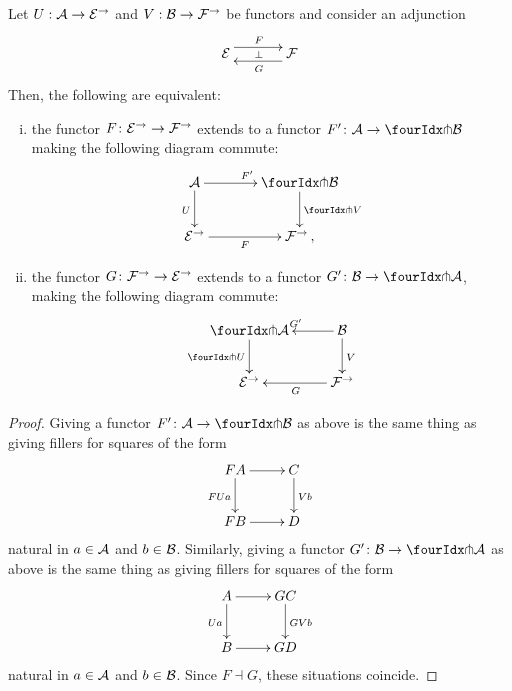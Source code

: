 \documentclass[reqno,10pt,a4paper,oneside]{amsart}
\begin{document}
\begin{proposition} \label{lift-of-adjunction} 
Let $U : \cal{A} \to \cal{E}^{\to}$ and $V : \cal{B} \to \cal{F}^{\to}$ be functors and consider an adjunction
\[
\xymatrix@C+1em{
  \cal{E}
  \ar@<5pt>[r]^{F}
  \ar@{}[r]|{\bot}
&
  \cal{F}
  \ar@<5pt>[l]^{G}
}
\]
Then, the following are equivalent:
\begin{enumerate}[(i)] 
\item the  functor $F \co \cal{E}^\to \to \cal{F}^\to$ extends to a functor $F' \co \cal{A} \to \liftl{\cal{B}}$ making the following diagram commute:
\[
\xymatrix@C=1.2cm{
  \cal{A}
  \ar[r]^{F'}
  \ar[d]_{U}
&
  \liftl{\cal{B}}
  \ar[d]^{\liftl{V}}
\\
  \cal{E}^{\to}
  \ar[r]_-{F}
&
  \cal{F}^{\to}\, ,}
\]
\item the functor $G \co \cal{F}^\to \to \cal{E}^\to$ extends to a functor $G' \co \cal{B} \to \liftr{\cal{A}}$, making the following diagram commute:
\[
\xymatrix{
  \liftr{\cal{A}}
  \ar[d]_{\liftr{U}}
&
  \cal{B}
  \ar[l]_{G'} 
  \ar[d]^{V}
\\
  \cal{E}^{\to}
&
  \cal{F}^{\to}
  \ar[l]^{G}
}
\]
\end{enumerate}
\end{proposition}

\begin{proof} Giving a functor $F' \co \cal{A} \to \liftl{\cal{B}}$ as above is the same thing as giving fillers for squares of the form
\[
\xymatrix{
FA \ar[d]_{FUa} \ar[r] & C \ar[d]^{Vb} \\
FB \ar[r] & D }
\]
natural in $a  \in \cal{A}$ and $b \in \cal{B}$. Similarly, giving a functor $G' \co \cal{B} \to \liftl{\cal{A}}$ as above is the same thing as giving fillers for squares 
of the form
\[
\xymatrix{
A \ar[d]_{Ua} \ar[r] & GC \ar[d]^{GVb} \\
B \ar[r] & GD }
\]
 natural in $a \in \cal{A}$ and $b \in \cal{B}$. Since $F \dashv G$, these situations coincide.
\end{proof}
\end{document}
